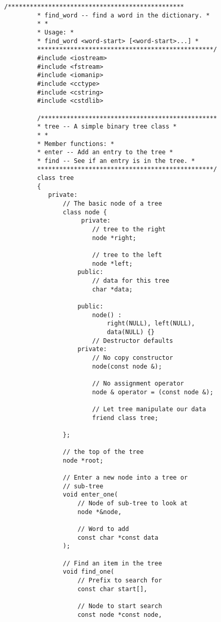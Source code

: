 \begin{LTR}
    \begin{lstlisting}[style=C++Style]
         /************************************************
         * find_word -- find a word in the dictionary. *
         * *
         * Usage: *
         * find_word <word-start> [<word-start>...] *
         ************************************************/
         #include <iostream>
         #include <fstream>
         #include <iomanip>
         #include <cctype>
         #include <cstring>
         #include <cstdlib>

         /************************************************
         * tree -- A simple binary tree class *
         * *
         * Member functions: *
         * enter -- Add an entry to the tree *
         * find -- See if an entry is in the tree. *
         ************************************************/
         class tree
         {
         	private:
         		// The basic node of a tree
         		class node {
        			 private:
         				// tree to the right
         				node *right;

         				// tree to the left
         				node *left;
         			public:
         				// data for this tree
         				char *data;

         			public:
         				node() :
         					right(NULL), left(NULL),
         					data(NULL) {}
         				// Destructor defaults
         			private:
         				// No copy constructor
         				node(const node &);

         				// No assignment operator
         				node & operator = (const node &);

         				// Let tree manipulate our data
         				friend class tree;

         		};

         		// the top of the tree
         		node *root;

         		// Enter a new node into a tree or
         		// sub-tree
         		void enter_one(
         			// Node of sub-tree to look at
         			node *&node,

        			// Word to add
         			const char *const data
         		);

         		// Find an item in the tree
         		void find_one(
         			// Prefix to search for
         			const char start[],

         			// Node to start search
         			const node *const node,


\end{lstlisting}
\end{LTR}
